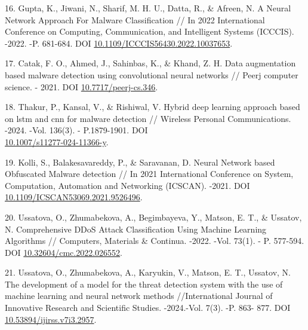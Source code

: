 \begin{references}
16. Gupta, K., Jiwani, N., Sharif, M. H. U., Datta, R., \& Afreen, N. A
Neural Network Approach For Malware Classification // In 2022
International Conference on Computing, Communication, and Intelligent
Systems (ICCCIS). -2022. -P. 681-684.
DOI \href{https://doi.org/10.1109/ICCCIS56430.2022.10037653}{10.1109/ICCCIS56430.2022.10037653}.

17. Catak, F. O., Ahmed, J., Sahinbas, K., \& Khand, Z. H. Data
augmentation based malware detection using convolutional neural
networks // Peerj computer science. - 2021.
DOI \href{https://doi.org/10.7717/peerj-cs.346}{10.7717/peerj-cs.346}.

18. Thakur, P., Kansal, V., \& Rishiwal, V. Hybrid deep learning approach
based on lstm and cnn for malware detection // Wireless Personal
Communications. -2024. -Vol. 136(3). - P.1879-1901. DOI
\\\href{https://doi.org/10.1007/s11277-024-11366-y}{10.1007/s11277-024-11366-y}.

19. Kolli, S., Balakesavareddy, P., \& Saravanan, D. Neural Network based
Obfuscated Malware detection // In 2021 International Conference on
System, Computation, Automation and Networking (ICSCAN). -2021. DOI
\href{https://doi.org/10.1109/ICSCAN53069.2021.9526496}{10.1109/ICSCAN53069.2021.9526496}.

20. Ussatova, O., Zhumabekova, A., Begimbayeva, Y., Matson, E. T., \&
Ussatov, N. Comprehensive DDoS Attack Classification Using Machine
Learning Algorithms // Computers, Materials \& Continua. -2022. -Vol.
73(1). - P. 577-594. DOI
\href{https://doi.org/10.32604/cmc.2022.026552}{10.32604/cmc.2022.026552}.

21. Ussatova, O., Zhumabekova, A., Karyukin, V., Matson, E. T., Ussatov,
N. The development of a model for the threat detection system with the
use of machine learning and neural network methods //International
Journal of Innovative Research and Scientific Studies. -2024.-Vol.
7(3). -P. 863- 877. DOI
\\\href{https://doi.org/10.53894/ijirss.v7i3.2957}{10.53894/ijirss.v7i3.2957}.
\end{references}

